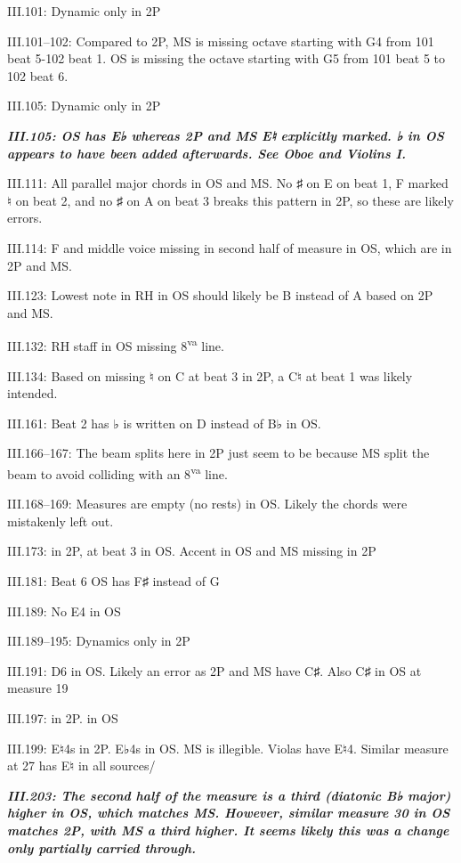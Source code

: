 \documentclass[twoside]{article}
\newcommand\dynmark[1]{\scalebox{0.9}{#1}{\kern1pt}}
\begin{document}
\begin{hangparas}{15pt}{1}
\begin{multicols}{2}
III.101: Dynamic only in 2P

III.101--102: Compared to 2P, MS is missing octave starting with G4 from 101 beat 5-102 beat 1. OS is missing the octave starting with G5 from 101 beat 5 to 102 beat 6.

III.105: Dynamic only in 2P

\textbf{\textit{III.105: OS has E♭ whereas 2P and MS E♮ explicitly marked. ♭ in OS appears to have been added afterwards. See Oboe and Violins I.}}

III.111: All parallel major chords in OS and MS. No ♯ on E on beat 1, F marked ♮ on beat 2, and no ♯ on A on beat 3 breaks this pattern in 2P, so these are likely errors.

III.114: F and middle voice missing in second half of measure in OS, which are in 2P and MS.

III.123: Lowest note in RH in OS should likely be B instead of A based on 2P and MS.

III.132: RH staff in OS missing 8\textsuperscript{va} line.

III.134: Based on missing ♮ on C at beat 3 in 2P, a C♮ at beat 1 was likely intended.

III.161: Beat 2 has ♭ is written on D instead of B♭ in OS.

III.166--167: The beam splits here in 2P just seem to be because MS split the beam to avoid colliding with an 8\textsuperscript{va} line.

III.168--169: Measures are empty (no rests) in OS. Likely the chords were mistakenly left out.

III.173: \dynmark{\mezzopiano} in 2P, \dynmark{\mf} at beat 3 in OS. Accent in OS and MS missing in 2P

III.181: Beat 6 OS has F♯ instead of G

III.189: No E4 in OS

III.189--195: Dynamics only in 2P

III.191: D6 in OS. Likely an error as 2P and MS have C♯. Also C♯ in OS at measure 19

III.197: \dynmark{\f} in 2P. \dynmark{\ff} in OS

III.199: E♮4s in 2P. E♭4s in OS. MS is illegible. Violas have E♮4. Similar measure at 27 has E♮ in all sources/

\textbf{\textit{III.203: The second half of the measure is a third (diatonic B♭ major) higher in OS, which matches MS. However, similar measure 30 in OS matches 2P, with MS a third higher. It seems likely this was a change only partially carried through.}}


\end{multicols}
\end{hangparas}
\end{document}
